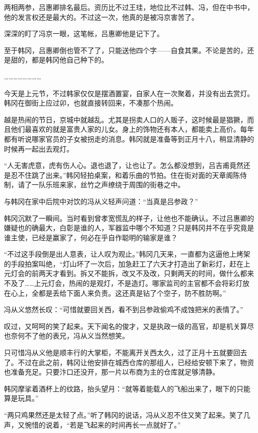 两相两参，吕惠卿排名最后。资历比不过王珪，地位比不过韩、冯，但在中书中，他的发言权还是最大的。不过这一次，他真的是被冯京害苦了。

深深的盯了冯京一眼，这笔帐，吕惠卿他是记下了。

至于韩冈，吕惠卿倒也管不了了，只能送他四个字——自食其果。不论是苦的，还是甜的，都是韩冈他自己种下的。

……………………

今天是上元节，不过韩家仅仅是摆酒置宴，自家人在一次聚着，并没有出去赏灯。韩冈在御街上应过卯，也就直接转回来，不凑那个热闹。

越是热闹的节日，京城中就越乱。尤其是拐卖人口的人贩子，这时候最是猖獗，而且他们最喜欢的就是富贵人家的儿女。身上的饰物还有本人，都能卖上高价。每年都有听说哪家官员的子女被拐走的消息。韩冈就是准备等到正月十八，稍显清静的时候再一起出去观灯。

“人无害虎意，虎有伤人心。退也退了，让也让了。怎么都没想到，吕吉甫竟然还是忍不住跳了出来。”韩冈轻拍桌案，和着乐曲的节拍。住在街对面的天章阁陈侍制，请了一队乐班来家，丝竹之声缭绕于周围的街巷之中。

与韩冈在家中后院中对饮的冯从义轻声问道：“当真是吕参政？”

韩冈沉默了一瞬间。当时看到曾孝宽慌乱的样子，让他也不能确认。不过吕惠卿的嫌疑也的确最大，白彰是谁的人，军器监中哪个不知道？只是韩冈并不在乎究竟是谁主使，已经是赢家了，何必在乎自作聪明的输家是谁？

“不过这手段倒是出人意表，让人叹为观止。”韩冈几天来，一直都为这逼他上烤架的手段拍案叫绝，“灯山坏了一次后，加急赶工了六天才打造出了新彩灯，赶在上元灯会的前两天才看到。拆又不能拆，改又不及改，只剩两天的时间，做什么都来不及了……上元灯会，热闹的是观灯，不是造灯。哪家监司的主官都不会将彩灯放在心上，全都是丢给下面人来负责。这还真是钻了个空子，防不胜防啊。”

冯从义悠然长叹：“可惜就要回关西，看不到吕参政偷鸡不成蚀把米的表情了。”

叹过，又呵呵的笑了起来。天下闻名的俊才，又是执政一级的高官，却是机关算尽也奈何不了他的表兄，冯从义当然想笑。

只可惜冯从义他是顺丰行的大掌柜，不能离开关西太久，过了正月十五就要回去了。不过在此之前，韩冈让他安排在城西仓库的那组人，已经给安顿下来了，物资也准备充足。只要汴口还没开，那一片以布商为主的仓库就足够清静。

韩冈摩挲着酒杯上的纹路，抬头望月：“就等着能载人的飞船出来了，眼下的只能算是玩具。”

“两只鸡果然还是太轻了点。”听了韩冈的说话，冯从义忍不住又笑了起来。笑了几声，又惋惜的说着，“若是飞起来的时间再长一点就好了。”

